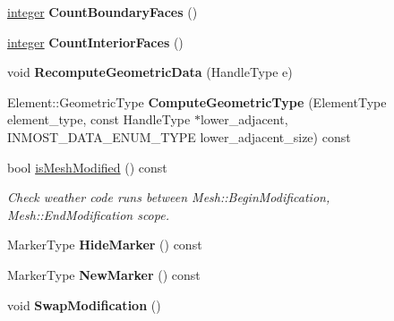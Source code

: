 \begin{DoxyCompactItemize}
\item 
\hypertarget{classINMOST_1_1Mesh_a28fac7af473402381cb2b967f4ae057c}{\hyperlink{classINMOST_1_1Storage_aec96942bc647417a801e2895b45964d2}{integer} {\bfseries Count\-Boundary\-Faces} ()}\label{classINMOST_1_1Mesh_a28fac7af473402381cb2b967f4ae057c}

\item 
\hypertarget{classINMOST_1_1Mesh_af89ada8254d449794ab4f55815963ecb}{\hyperlink{classINMOST_1_1Storage_aec96942bc647417a801e2895b45964d2}{integer} {\bfseries Count\-Interior\-Faces} ()}\label{classINMOST_1_1Mesh_af89ada8254d449794ab4f55815963ecb}

\item 
\hypertarget{classINMOST_1_1Mesh_a1263ae4c38b01550f28ee6f502d75246}{void {\bfseries Recompute\-Geometric\-Data} (Handle\-Type e)}\label{classINMOST_1_1Mesh_a1263ae4c38b01550f28ee6f502d75246}

\item 
\hypertarget{classINMOST_1_1Mesh_a3e7891840e8ed563be5b88da0f8b7f95}{Element\-::\-Geometric\-Type {\bfseries Compute\-Geometric\-Type} (Element\-Type element\-\_\-type, const Handle\-Type $\ast$lower\-\_\-adjacent, I\-N\-M\-O\-S\-T\-\_\-\-D\-A\-T\-A\-\_\-\-E\-N\-U\-M\-\_\-\-T\-Y\-P\-E lower\-\_\-adjacent\-\_\-size) const }\label{classINMOST_1_1Mesh_a3e7891840e8ed563be5b88da0f8b7f95}

\item 
bool \hyperlink{classINMOST_1_1Mesh_a870a18031c98f36972e6df4c21859a28}{is\-Mesh\-Modified} () const 
\begin{DoxyCompactList}\small\item\em Check weather code runs between Mesh\-::\-Begin\-Modification, Mesh\-::\-End\-Modification scope. \end{DoxyCompactList}\item 
\hypertarget{classINMOST_1_1Mesh_ad113bb7fdc195cda837274fd9cdda4a2}{Marker\-Type {\bfseries Hide\-Marker} () const }\label{classINMOST_1_1Mesh_ad113bb7fdc195cda837274fd9cdda4a2}

\item 
\hypertarget{classINMOST_1_1Mesh_a0456acc039a3199e0d7e38d6d1a72400}{Marker\-Type {\bfseries New\-Marker} () const }\label{classINMOST_1_1Mesh_a0456acc039a3199e0d7e38d6d1a72400}

\item 
\hypertarget{classINMOST_1_1Mesh_ac0175d8aad4ca37cdf5ad67627204ded}{void {\bfseries Swap\-Modification} ()}\label{classINMOST_1_1Mesh_ac0175d8aad4ca37cdf5ad67627204ded}


\end{DoxyCompactItemize}
